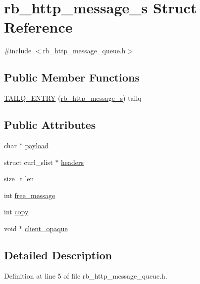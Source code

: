 \hypertarget{structrb__http__message__s}{}\section{rb\+\_\+http\+\_\+message\+\_\+s Struct Reference}
\label{structrb__http__message__s}


{\ttfamily \#include $<$rb\+\_\+http\+\_\+message\+\_\+queue.\+h$>$}

\subsection*{Public Member Functions}
\begin{DoxyCompactItemize}
\item 
\hyperlink{structrb__http__message__s_a1443be49b0a12165e9ed6c801284a56b}{T\+A\+I\+L\+Q\+\_\+\+E\+N\+T\+R\+Y} (\hyperlink{structrb__http__message__s}{rb\+\_\+http\+\_\+message\+\_\+s}) tailq
\end{DoxyCompactItemize}
\subsection*{Public Attributes}
\begin{DoxyCompactItemize}
\item 
char $\ast$ \hyperlink{structrb__http__message__s_a70cd28f794d09eb47cf19a37fb7ba42b}{payload}
\item 
struct curl\+\_\+slist $\ast$ \hyperlink{structrb__http__message__s_ae12176a1bd60ed536eda95e2c530acc4}{headers}
\item 
size\+\_\+t \hyperlink{structrb__http__message__s_a8c352ee939f1cd197bf009583e61552f}{len}
\item 
int \hyperlink{structrb__http__message__s_acbfdd79b7ec041a7b7e0edac1da72d30}{free\+\_\+message}
\item 
int \hyperlink{structrb__http__message__s_aceda798a9af4f28a6dc89b273e6c348a}{copy}
\item 
void $\ast$ \hyperlink{structrb__http__message__s_aa25eb69a09434b70882260a326dd704c}{client\+\_\+opaque}
\end{DoxyCompactItemize}


\subsection{Detailed Description}


Definition at line 5 of file rb\+\_\+http\+\_\+message\+\_\+queue.\+h.



